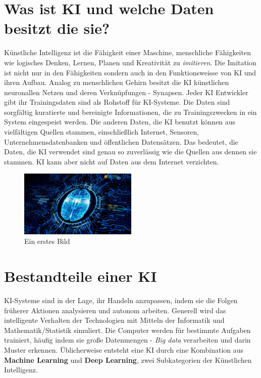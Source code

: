 \documentclass{report}
\begin{document}
\chapter{Was ist KI und welche Daten besitzt die sie?}

Künstliche Intelligenz ist die Fähigkeit einer Maschine, menschliche Fähigkeiten wie logisches Denken, 
Lernen, Planen und Kreativität zu \textit{imitieren}. Die Imitation ist nicht nur in den Fähigkeiten sondern auch in den 
Funktionsweisse von KI und ihren Aufbau. Analog zu menschlichen Gehirn besitzt die KI künstlichen neuronallen Netzen und 
deren Verknüpfungen - Synapsen. Jeder KI Entwickler gibt ihr Trainingsdaten sind als Rohstoff für KI-Systeme. Die Daten sind sorgfältig 
kuratierte und bereinigte Informationen, die zu Trainingszwecken in ein System eingespeist werden.
Die anderen Daten, die KI benutzt können aus vielfältigen Quellen stammen, einschließlich Internet, Sensoren,
  Unternehmensdatenbanken und öffentlichen Datensätzen. Das bedeutet, die Daten, die KI verwendet sind genau so zuverlässig wie die Quellen aus dennen sie stammen.
KI kann aber nicht auf Daten aus dem Internet verzichten.  

\begin{figure}[h]
  \centering 
  \includegraphics[width=0.5\textwidth]{ki-im-sensor.jpg} 
  \caption{Ein erstes Bild}
  \label{fig:meme}
  \end{figure}

   \chapter{Bestandteile einer KI}
 
KI-Systeme sind in der Lage, ihr Handeln anzupassen, indem sie die Folgen früherer Aktionen analysieren und autonom arbeiten.
 Generell wird das intelligente Verhalten der 
Technologien mit Mitteln der Informatik und Mathematik/Statistik simuliert.
 Die Computer werden für bestimmte Aufgaben trainiert, häufig indem sie große Datenmengen - \textit{Big data}
 verarbeiten und darin Muster erkennen. Üblicherweise entsteht eine KI durch eine Kombination aus  \textbf{Machine
  Learning} und  \textbf{Deep Learning}, zwei Subkategorien der Künstlichen Intelligenz.
\end{document}
